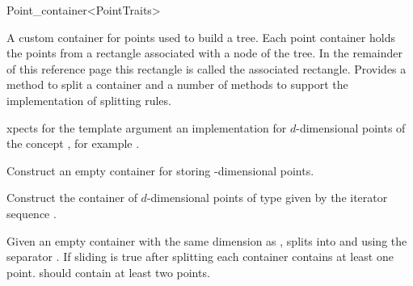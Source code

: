 

\begin{ccRefClass}{Point_container<PointTraits>}



\begin{ccAdvanced}


\ccDefinition
A custom container for points used to build a tree. Each point container
holds the points from a rectangle associated with a node of the tree.
In the remainder of this reference page this rectangle is called the
associated rectangle.
Provides a method to split a container and a number of methods
to support the implementation of splitting rules.


\ccParameters
xpects for the  template argument
an implementation for
$d$-dimensional points of
the concept , 
for example .

\ccTypes


\ccCreation
{}

{
Construct an empty container for storing -dimensional points.
}

{
Construct the container of $d$-dimensional points of type 
given by the iterator sequence \ccc{[begin, end)}.
}



\ccOperations

{Given an empty container  with the same dimension as , splits  into
 and  using the separator . If sliding is true after splitting 
each container contains at least one point.  should contain at least two points.}



\end{ccAdvanced}
\end{ccRefClass}

